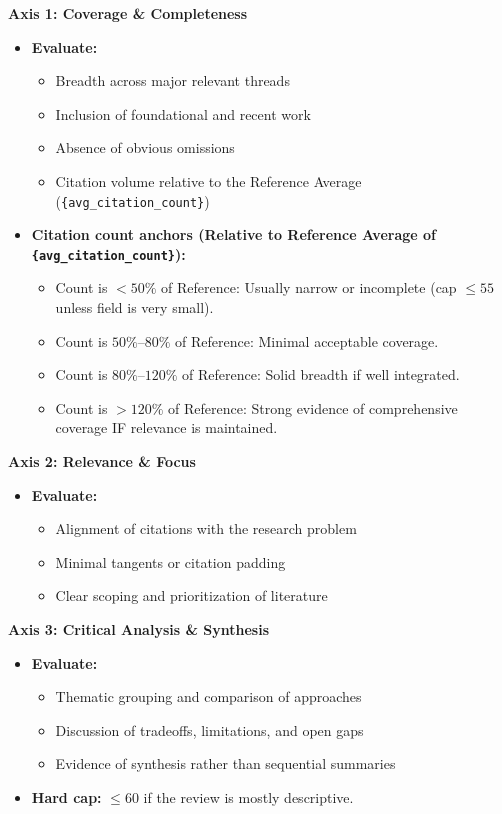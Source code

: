 \vspace{0.5em}
\noindent\textbf{Axis 1: Coverage \& Completeness}
\begin{itemize}
    \item \textbf{Evaluate:}
    \begin{itemize}
        \item Breadth across major relevant threads
        \item Inclusion of foundational and recent work
        \item Absence of obvious omissions
        \item Citation volume relative to the Reference Average (\texttt{\{avg\_citation\_count\}})
    \end{itemize}
    \item \textbf{Citation count anchors (Relative to Reference Average of \texttt{\{avg\_citation\_count\}}):}
    \begin{itemize}
        \item Count is $< 50\%$ of Reference: Usually narrow or incomplete (cap $\leq 55$ unless field is very small).
        \item Count is $50\%$--$80\%$ of Reference: Minimal acceptable coverage.
        \item Count is $80\%$--$120\%$ of Reference: Solid breadth if well integrated.
        \item Count is $> 120\%$ of Reference: Strong evidence of comprehensive coverage IF relevance is maintained.
    \end{itemize}
\end{itemize}

\vspace{0.5em}
\noindent\textbf{Axis 2: Relevance \& Focus}
\begin{itemize}
    \item \textbf{Evaluate:}
    \begin{itemize}
        \item Alignment of citations with the research problem
        \item Minimal tangents or citation padding
        \item Clear scoping and prioritization of literature
    \end{itemize}
\end{itemize}

\vspace{0.5em}
\noindent\textbf{Axis 3: Critical Analysis \& Synthesis}
\begin{itemize}
    \item \textbf{Evaluate:}
    \begin{itemize}
        \item Thematic grouping and comparison of approaches
        \item Discussion of tradeoffs, limitations, and open gaps
        \item Evidence of synthesis rather than sequential summaries
    \end{itemize}
    \item \textbf{Hard cap:} $\leq 60$ if the review is mostly descriptive.
\end{itemize}

